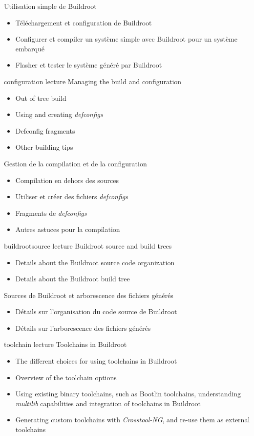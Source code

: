 {Utilisation simple de Buildroot}
{
  \begin{itemize}
  \item Téléchargement et configuration de Buildroot
  \item Configurer et compiler un système simple avec Buildroot pour
    un système embarqué
  \item Flasher et tester le système généré par Buildroot
  \end{itemize}
}
{configuration}
{lecture}
{Managing the build and configuration}
{
  \begin{itemize}
  \item Out of tree build
  \item Using and creating {\em defconfigs}
  \item Defconfig fragments
  \item Other building tips
  \end{itemize}
}
{Gestion de la compilation et de la configuration}
{
  \begin{itemize}
  \item Compilation en dehors des sources
  \item Utiliser et créer des fichiers {\em defconfigs}
  \item Fragments de {\em defconfigs}
  \item Autres astuces pour la compilation
  \end{itemize}
}
{buildrootsource}
{lecture}
{Buildroot source and build trees}
{
  \begin{itemize}
  \item Details about the Buildroot source code organization
  \item Details about the Buildroot build tree
  \end{itemize}
}
{Sources de Buildroot et arborescence des fichiers générés}
{
  \begin{itemize}
  \item Détails sur l'organisation du code source de Buildroot
  \item Détails sur l'arborescence des fichiers générés
  \end{itemize}
}
{toolchain}
{lecture}
{Toolchains in Buildroot}
{
  \begin{itemize}
  \item The different choices for using toolchains in Buildroot
  \item Overview of the toolchain options
  \item Using existing binary toolchains, such as Bootlin
    toolchains, understanding {\em multilib} capabilities and
    integration of toolchains in Buildroot
  \item Generating custom toolchains with {\em Crosstool-NG}, and
    re-use them as external toolchains
  \end{itemize}
}

